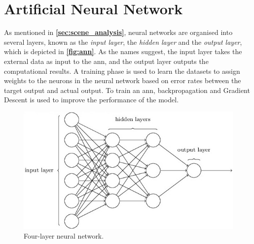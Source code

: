 \section{Artificial Neural Network} \label{neuralnetwork}  
As mentioned in \textbf{\autoref{sec:scene_analysis}}, neural networks are organised into several layers, known as the \textit{input layer}, the \textit{hidden layer} and the \textit{output layer}, which is depicted in \textbf{\autoref{fig:ann}}. As the names suggest, the input layer takes the external data as input to the \gls{ann}, and the output layer outputs the computational results. A training phase is used to learn the datasets to assign weights to the neurons in the neural network based on error rates between the target output and actual output.\cite{SAIRAMYA2019253} To train an \gls{ann}, backpropagation and Gradient Descent is used to improve the performance of the model\cite{SAIRAMYA2019253, ann}.

\begin{figure}[H]
    \centering
    \includegraphics[scale=0.75]{Images/Experiments/ann_architecture.jpg}
    \caption{Four-layer neural network\cite{ann}.}
     \label{fig:ann}
\end{figure}


